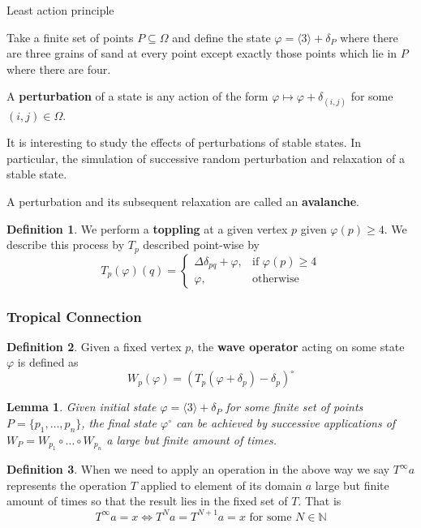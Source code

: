 \documentclass[12pt,a4paper]{amsart}
\newcommand{\N}{\mathbb{N}}
\newtheorem{lem}[thm]{Lemma}
\theoremstyle{definition}
\newtheorem{defn}{Definition}[section]
\theoremstyle{remark}
\begin{document}
Least action principle

\ex
Take a finite set of points $P\subseteq\Omega$ and define the state $\varphi=\langle3\rangle+\delta_P$ where there are three grains of sand at every point except exactly those points which lie in $P$ where there are four.

A \textbf{perturbation} of a state is any action of the form $\varphi \mapsto \varphi + \delta_{(i,j)}$ for some $(i,j)\in\Omega$.

It is interesting to study the effects of perturbations of stable states. In particular, the simulation of successive random perturbation and relaxation of a stable state.

A perturbation and its subsequent relaxation are called an \textbf{avalanche}.

\begin{defn}
We perform a \textbf{toppling} at a given vertex $p$ given $\varphi(p) \geq 4$. We describe this process by $T_p$ described point-wise by
\begin{equation}
    T_p(\varphi)(q) =
    \begin{cases}
    \Delta\delta_{p q} + \varphi,& \text{if }\varphi(p) \geq 4\\
    \varphi,& \text{otherwise}
    \end{cases}
\end{equation}
\end{defn}

\subsubsection{Tropical Connection}

\begin{defn}
Given a fixed vertex $p$, the \textbf{wave operator} acting on some state $\varphi$ is defined as
\begin{equation}
    W_p(\varphi) = (T_p(\varphi+\delta_p)-\delta_p)^\circ
\end{equation}
\end{defn}

\begin{lem}\label{waveFinalState}
Given initial state $\varphi = \langle 3 \rangle + \delta_P$ for some finite set of points $P = \{p_1,\dots,p_n\}$, the final state $\varphi^\circ$ can be achieved by successive applications of $W_P = W_{p_1}\circ\dots\circ W_{p_n}$ a large but finite amount of times.
\end{lem}

\begin{defn}
When we need to apply an operation in the above way we say $T^\infty a$ represents the operation $T$ applied to element of its domain $a$ large but finite amount of times so that the result lies in the fixed set of $T$. That is
\begin{equation}
    T^\infty a = x \iff T^Na=T^{N+1}a=x\text{ for some }N\in\N
\end{equation}
\end{defn}
\end{document}
